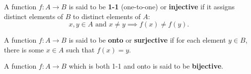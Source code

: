 A function $f: A \to B$ is said to be \textbf{1-1} (one-to-one) or \textbf{injective} if it assigns distinct elements of $B$ to distinct elements of $A$:
$$x, y \in A \text{ and } x \neq y \implies f(x) \neq f(y).$$

A function $f: A \to B$ is said to be \textbf{onto} or \textbf{surjective} if for each element $y \in B$, there is some $x \in A$ such that $f(x) = y$.

A function $f: A \to B$ which is both 1-1 and onto is said to be \textbf{bijective}.
